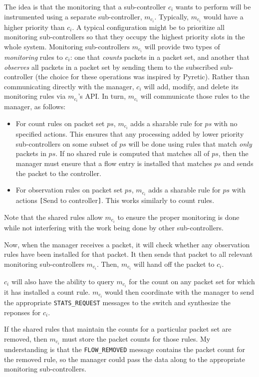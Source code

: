 \documentclass{article}
\begin{document}
The idea is that the monitoring that a sub-controller $c_i$ wants to perform
will be instrumented using a separate sub-controller, $m_{c_i}$. 
Typically, $m_{c_i}$ would have a higher priority than $c_i$.
A typical configuration might be to prioritize all monitoring sub-controllers 
so that they occupy the highest priority slots in the whole system.
Monitoring sub-controllers $m_{c_i}$ will provide two types of \emph{monitoring}
rules to $c_i$:
one that \emph{counts} packets in a packet set, and another that \emph{observes}
all packets in a packet set by sending them to the subscribed sub-controller
(the choice for these operations was inspired by Pyretic).
Rather than communicating directly with the manager, $c_i$ will add, modify,
and delete its monitoring rules via $m_{c_i}$'s API. 
In turn, $m_{c_i}$ will communicate those rules to the manager, as follows:
\begin{itemize}
\item For count rules on packet set $ps$, $m_{c_i}$ adds a sharable rule for
$ps$ with no specified actions. This ensures that any processing added
by lower priority sub-controllers on some subset of $ps$ will be done using
rules that match \emph{only} packets in $ps$. 
If no shared rule is computed that matches all of $ps$, then the manager
must ensure that a flow entry is installed that matches $ps$ and sends
the packet to the controller.
\item For observation rules on packet set $ps$, $m_{c_i}$ adds a sharable rule 
for $ps$ with actions \texttt{[}Send to controller\texttt{]}.
This works similarly to count rules.
\end{itemize}

Note that the shared rules allow $m_{c_i}$ to ensure the proper monitoring
is done while not interfering with the work being done by other sub-controllers.

Now, when the manager receives a packet, it will check whether any observation
rules have been installed for that packet. It then sends that packet to all
relevant monitoring sub-controllers $m_{c_i}$. Then, $m_{c_i}$ will hand off
the packet to $c_i$.

$c_i$ will also have the ability to query $m_{c_i}$ for the count on any packet
set for which it has installed a count rule. $m_{c_i}$ would then coordinate
with the manager to send the appropriate \texttt{STATS\_REQUEST} messages
to the switch and synthesize the reponses for $c_i$.

If the shared rules that maintain the counts for a particular packet set are 
removed, then $m_{c_i}$ must store the packet counts for those rules.
My understanding is that the \texttt{FLOW\_REMOVED} message contains
the packet count for the removed rule, so the manager could pass the data along
to the appropriate monitoring sub-controllers.
\end{document}
